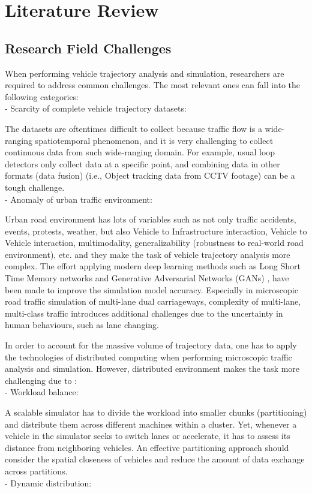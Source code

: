 \documentclass[11pt]{uonthesis}
\begin{document}
\chapter{Literature Review}
\section{Research Field Challenges}
When performing vehicle trajectory analysis and simulation, researchers are required to address common challenges. The most relevant ones can fall into the following categories:
\\
\noindent- Scarcity of complete vehicle trajectory datasets:

The datasets are oftentimes difficult to collect because traffic flow is a wide-ranging spatiotemporal phenomenon, and it is very challenging to collect continuous data from such wide-ranging domain\cite{seo2020evaluation}. For example, usual loop detectors only collect data at a specific point, and combining data in other formats (data fusion) (i.e., Object tracking data from CCTV footage) can be a tough challenge.
\\
\noident- Anomaly of urban traffic environment:

Urban road environment has lots of variables such as not only traffic accidents, events, protests, weather, but also Vehicle to Infrastructure interaction, Vehicle to Vehicle interaction, multimodality, generalizability (robustness to real-world road environment), etc. and they make the task of vehicle trajectory analysis more complex. The effort applying modern deep learning methods such as Long Short Time Memory networks and Generative Adversarial Networks (GANs) \cite{rossi2021vehicle}, have been made to improve the simulation model accuracy. Especially in microscopic road traffic simulation of multi-lane dual carriageways, complexity of multi-lane, multi-class traffic introduces additional challenges due to the uncertainty in human behaviours, such as lane changing\cite{DAHIYA2022100066}.

In order to account for the massive volume of trajectory data, one has to apply the technologies of distributed computing when performing microscopic traffic analysis and simulation. However, distributed environment makes the task more challenging due to \cite{yu2020dissecting}:
\\
\noindent- Workload balance:

A scalable simulator has to divide the workload into smaller chunks (partitioning) and distribute them across different machines within a cluster. Yet, whenever a vehicle in the simulator seeks to switch lanes or accelerate, it has to assess its distance from neighboring vehicles. An effective partitioning approach should consider the spatial closeness of vehicles and reduce the amount of data exchange across partitions.
\\
\noindent- Dynamic distribution:
\end{document}
